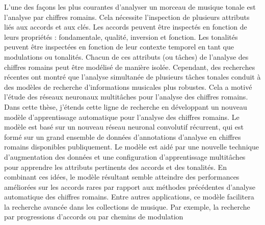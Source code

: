 L'une des façons les plus courantes d'analyser un morceau de
musique tonale est l'analyse par chiffres romains. Cela
nécessite l'inspection de plusieurs attributs liés aux
accords et aux clés. Les accords peuvent être inspectés en
fonction de leurs propriétés : fondamentale, qualité,
inversion et fonction. Les tonalités peuvent être inspectées
en fonction de leur contexte temporel en tant que
modulations ou tonalités. Chacun de ces attributs (ou
tâches) de l'analyse des chiffres romains peut être modélisé
de manière isolée. Cependant, des recherches récentes ont
montré que l'analyse simultanée de plusieurs tâches tonales
conduit à des modèles de recherche d'informations musicales
plus robustes. Cela a motivé l'étude des réseaux neuronaux
multitâches pour l'analyse des chiffres romains. Dans cette
thèse, j'étends cette ligne de recherche en développant un
nouveau modèle d'apprentissage automatique pour l'analyse
des chiffres romains. Le modèle est basé sur un nouveau
réseau neuronal convolutif récurrent, qui est formé sur un
grand ensemble de données d'annotations d'analyse en
chiffres romains disponibles publiquement. Le modèle est
aidé par une nouvelle technique d'augmentation des données
et une configuration d'apprentissage multitâches pour
apprendre les attributs pertinents des accords et des
tonalités. En combinant ces idées, le modèle résultant
semble atteindre des performances améliorées sur les accords
rares par rapport aux méthodes précédentes d'analyse
automatique des chiffres romains. Entre autres applications,
ce modèle facilitera la recherche avancée dans les
collections de musique. Par exemple, la recherche par
progressions d'accords ou par chemins de modulation
